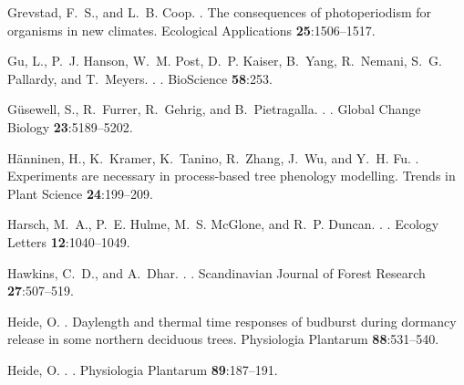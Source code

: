 \documentclass{article}
\begin{document}
\begin{thebibliography}{131}
Grevstad, F.~S., and L.~B. Coop.
.
\newblock The consequences of photoperiodism for organisms in new climates.
\newblock Ecological Applications {\bf 25}:1506--1517.

Gu, L., P.~J. Hanson, W.~M. Post, D.~P. Kaiser, B.~Yang, R.~Nemani, S.~G.
  Pallardy, and T.~Meyers.
.
.
\newblock BioScience {\bf 58}:253.

G{\"u}sewell, S., R.~Furrer, R.~Gehrig, and B.~Pietragalla.
.
.
\newblock Global Change Biology {\bf 23}:5189--5202.

{H\"{a}nninen}, H., K.~Kramer, K.~Tanino, R.~Zhang, J.~Wu, and Y.~H. Fu.
.
\newblock Experiments are necessary in process-based tree phenology modelling.
\newblock Trends in Plant Science {\bf 24}:199--209.

Harsch, M.~A., P.~E. Hulme, M.~S. McGlone, and R.~P. Duncan.
.
.
\newblock Ecology Letters {\bf 12}:1040--1049.

Hawkins, C.~D., and A.~Dhar.
.
.
\newblock Scandinavian Journal of Forest Research {\bf 27}:507--519.

Heide, O.
.
\newblock Daylength and thermal time responses of budburst during dormancy
  release in some northern deciduous trees.
\newblock Physiologia Plantarum {\bf 88}:531--540.

Heide, O.
.
.
\newblock Physiologia Plantarum {\bf 89}:187--191.


\end{thebibliography}
\end{document}
